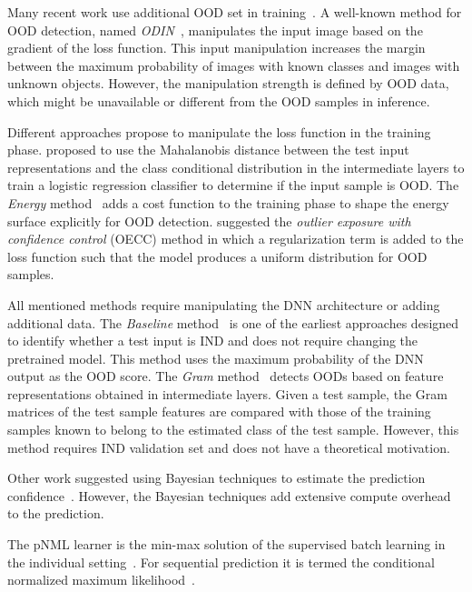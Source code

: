 \documentclass{article}
\newcommand{\minisection}[1]{\vspace{2mm}\noindent{\textbf{#1.}}}
\begin{document}
\minisection{OOD detection} 
Many recent work use additional OOD set in training~\citep{DBLP:conf/nips/MalininG18,DBLP:conf/iclr/HendrycksMD19,DBLP:conf/nips/NandyHL20,DBLP:conf/aaai/MohseniPYW20}.
A well-known method for OOD detection, named \textit{ODIN}~\citep{liang2017enhancing}, manipulates the input image based on the gradient of the loss function. 
This input manipulation increases the margin between the maximum probability of images with known classes and images with unknown objects.
However, the manipulation strength is defined by OOD data, which might be unavailable or different from the OOD samples in inference.




Different approaches propose to manipulate the loss function in the training phase.
\citet{lee2018simple} proposed to use the Mahalanobis distance between the test input representations and the class conditional distribution in the intermediate layers to train a logistic regression classifier to determine if the input sample is OOD.
The \textit{Energy} method~\citep{liu2020energy} adds a cost function to the training phase to shape the energy surface explicitly for OOD detection.
\citet{PAPADOPOULOS2021138} suggested the \textit{outlier exposure with confidence control} (OECC) method in which a regularization term is added to the loss function such that the model produces a uniform distribution for OOD samples.


All mentioned methods require manipulating the DNN architecture or adding additional data.
The \textit{Baseline} method~\citep{hendrycks17baseline} is one of the earliest approaches designed to identify whether a test input is IND and does not require changing the pretrained model. This method uses the maximum probability of the DNN output as the OOD score.
The \emph{Gram} method~\citep{gram} detects OODs based on feature representations obtained in intermediate layers. 
Given a test sample, the Gram matrices of the test sample features are compared with those of the training samples known to belong to the estimated class of the test sample. 
However, this method requires IND validation set and does not have a theoretical motivation.

Other work suggested using Bayesian techniques to estimate the prediction confidence~\citep{DBLP:conf/icml/GalG16,DBLP:conf/nips/Lakshminarayanan17,DBLP:conf/icml/AmersfoortSTG20}. However, the Bayesian techniques add extensive compute overhead to the prediction.

\minisection{The pNML learner}
The pNML learner is the min-max solution of the supervised batch learning in the individual setting~\citep{fogel2018universal}. For sequential prediction it is termed the conditional normalized maximum likelihood~\citep{rissanen2007conditional,roos2008sequentially}.
\end{document}
